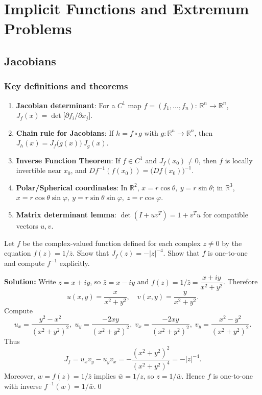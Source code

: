 \chapter{Implicit Functions and Extremum Problems}

\section{Jacobians}
\subsection*{Key definitions and theorems}
\begin{enumerate}[label=(\roman*)]
    \item \textbf{Jacobian determinant}: For a $C^1$ map $f=(f_1,\dots,f_n):\,\mathbb R^n\to\mathbb R^n$, $J_f(x)=\det\big[\partial f_i/\partial x_j\big]$.
    \item \textbf{Chain rule for Jacobians}: If $h=f\circ g$ with $g: \mathbb R^n\to\mathbb R^n$, then $J_h(x)=J_f\big(g(x)\big)\,J_g(x)$.
    \item \textbf{Inverse Function Theorem}: If $f\in C^1$ and $J_f(x_0)\neq 0$, then $f$ is locally invertible near $x_0$, and $D f^{-1}(f(x_0))=\big(D f(x_0)\big)^{-1}$.
    \item \textbf{Polar/Spherical coordinates}: In $\mathbb R^2$, $x=r\cos\theta,\ y=r\sin\theta$; in $\mathbb R^3$, $x=r\cos\theta\sin\varphi,\ y=r\sin\theta\sin\varphi,\ z=r\cos\varphi$.
    \item \textbf{Matrix determinant lemma}: $\det(I+uv^{\!T})=1+v^{\!T}u$ for compatible vectors $u,v$.
\end{enumerate}


\begin{problembox}
Let \( f \) be the complex-valued function defined for each complex \( z \neq 0 \) by the equation \( f(z) = 1/\bar{z} \). Show that \( J_f(z) = -|z|^{-4} \). Show that \( f \) is one-to-one and compute \( f^{-1} \) explicitly.
\end{problembox}

\bigskip\noindent\textbf{Solution:}
Write $z=x+iy$, so $\bar z=x-iy$ and $f(z)=1/\bar z=\dfrac{x+iy}{x^2+y^2}$. Therefore
\[u(x,y)=\frac{x}{x^2+y^2},\quad v(x,y)=\frac{y}{x^2+y^2}.
\]
Compute
\[u_x=\frac{y^2-x^2}{(x^2+y^2)^2},\; u_y=\frac{-2xy}{(x^2+y^2)^2},\; v_x=\frac{-2xy}{(x^2+y^2)^2},\; v_y=\frac{x^2-y^2}{(x^2+y^2)^2}.
\]
Thus
\[J_f=u_xv_y-u_yv_x=-\frac{(x^2+y^2)^2}{(x^2+y^2)^4}=-|z|^{-4}.
\]
Moreover, $w=f(z)=1/\bar z$ implies $\bar w=1/z$, so $z=1/\bar w$. Hence $f$ is one-to-one with inverse $f^{-1}(w)=1/\bar w$.\qed


